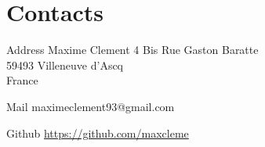 \documentclass[hidelinks]{cv-style}          %
\begin{document}

\section{Contacts}

\begin{entrylist}
\entry
  {Address}
  {Maxime Clement}
  {}
  {
  4 Bis Rue Gaston Baratte\\
59493 Villeneuve d'Ascq\\ 
France\\
}

\entry
  {Mail}
  {maximeclement93@gmail.com}
  {}
  {}
  
\entry
  {Github}
  {\url{https://github.com/maxcleme}}
  {}
  {}
\end{entrylist}
\end{document}

